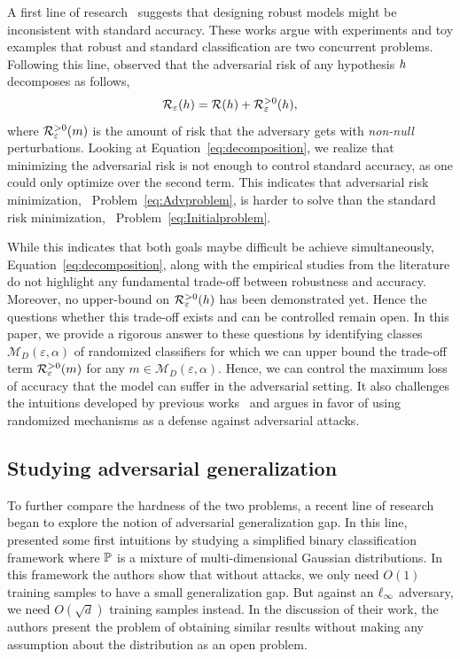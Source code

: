 A first line of research~\citep{su2018robustness,10.5555/3327546.3327734,tsipras2018robustness} suggests that designing robust models might be inconsistent with standard accuracy. These works argue with experiments and toy examples that robust and standard classification are two concurrent problems. Following this line, \cite{zhang2019theoretically} observed that the adversarial risk of any hypothesis ${h}$ decomposes as follows,
\begin{equation}
\mathcal{R}_\varepsilon({h}) =  \mathcal{R}({h}) +  \mathcal{R}^{>0}_\varepsilon({h}),
\label{eq:decomposition}
\end{equation} 
where $\mathcal{R}^{>0}_\varepsilon(m)$ is the amount of risk that the adversary gets with \emph{non-null} perturbations. Looking at Equation~\eqref{eq:decomposition}, we realize that minimizing the adversarial risk is not enough to control standard accuracy, as one could only optimize over the second term. This indicates that adversarial risk minimization, \ie~Problem~\eqref{eq:Advproblem}, is harder to solve than the standard risk minimization, \ie~Problem~\eqref{eq:Initialproblem}. 

While this indicates that both goals maybe difficult be achieve simultaneously, Equation~\eqref{eq:decomposition}, along with the empirical studies from the literature  do not highlight any fundamental trade-off between robustness and accuracy. Moreover, no upper-bound on $\mathcal{R}^{>0}_\varepsilon({h})$ has been demonstrated yet. Hence the questions whether this trade-off exists and can be controlled remain open. In this paper, we provide a rigorous answer to these questions by identifying classes $\mathcal{M}_D(\varepsilon,\alpha)$ of randomized classifiers for which we can upper bound the trade-off term $\mathcal{R}^{>0}_\varepsilon(m  )$ for any $m  \in \mathcal{M}_D(\varepsilon,\alpha)$. Hence, we can control the maximum loss of accuracy that the model can suffer in the adversarial setting. It also challenges the intuitions developed by previous works~\citep{su2018robustness,10.5555/3327546.3327734,tsipras2018robustness} and argues in favor of using randomized mechanisms as a defense against adversarial attacks.

\subsection{Studying adversarial generalization}

To further compare the hardness of the two problems, a recent line of research began to explore the notion of adversarial generalization gap. In this line, \cite{schmidt2018adversarially} presented some first intuitions by studying a simplified binary classification framework where $\mathbb{P}$ is a mixture of multi-dimensional Gaussian distributions. In this framework the authors show that without attacks,  we only need $O(1)$ training samples to have a small generalization gap.
But against an $\ell_\infty$ adversary, we need $O(\sqrt{d})$ training samples instead. In the discussion of their work, the authors present the problem of obtaining similar results without making any assumption about the distribution as an open problem. 


